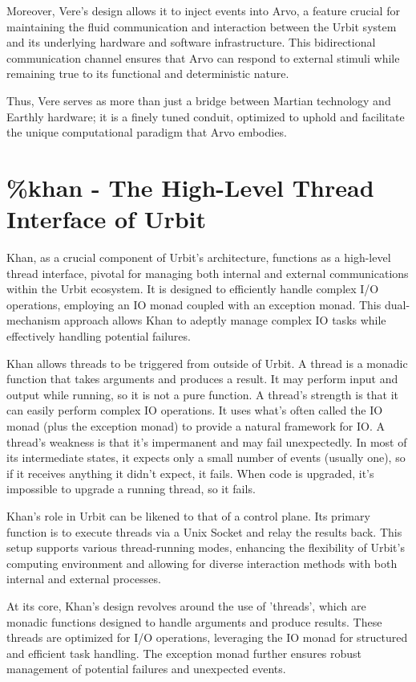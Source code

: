 \documentclass[twoside]{article}
\begin{document}
Moreover, Vere's design allows it to inject events into Arvo, a feature crucial for maintaining the fluid communication and interaction between the Urbit system and its underlying hardware and software infrastructure. This bidirectional communication channel ensures that Arvo can respond to external stimuli while remaining true to its functional and deterministic nature. 

Thus, Vere serves as more than just a bridge between Martian technology and Earthly hardware; it is a finely tuned conduit, optimized to uphold and facilitate the unique computational paradigm that Arvo embodies.


\section{\%khan - The High-Level Thread Interface of Urbit}

Khan, as a crucial component of Urbit's architecture, functions as a high-level thread interface, pivotal for managing both internal and external communications within the Urbit ecosystem. It is designed to efficiently handle complex I/O operations, employing an IO monad coupled with an exception monad. This dual-mechanism approach allows Khan to adeptly manage complex IO tasks while effectively handling potential failures.

Khan allows threads to be triggered from outside of Urbit. A thread is a monadic function that takes arguments and produces a result. It may perform input and output while running, so it is not a pure function. A thread's strength is that it can easily perform complex IO operations. It uses what's often called the IO monad (plus the exception monad) to provide a natural framework for IO. A thread's weakness is that it's impermanent and may fail unexpectedly. In most of its intermediate states, it expects only a small number of events (usually one), so if it receives anything it didn't expect, it fails. When code is upgraded, it's impossible to upgrade a running thread, so it fails.

Khan's role in Urbit can be likened to that of a control plane. Its primary function is to execute threads via a Unix Socket and relay the results back. This setup supports various thread-running modes, enhancing the flexibility of Urbit's computing environment and allowing for diverse interaction methods with both internal and external processes.

At its core, Khan's design revolves around the use of 'threads', which are monadic functions designed to handle arguments and produce results. These threads are optimized for I/O operations, leveraging the IO monad for structured and efficient task handling. The exception monad further ensures robust management of potential failures and unexpected events.
\end{document}

